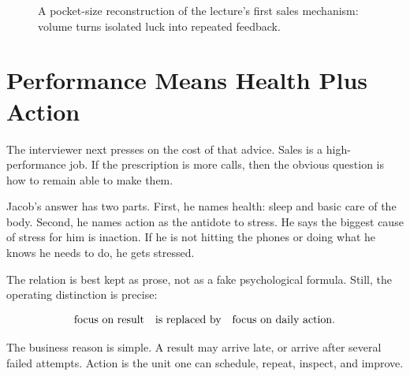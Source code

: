 \begin{figure}
\centering
{}
\caption{A pocket-size reconstruction of the lecture's first sales mechanism: volume turns isolated luck into repeated feedback.}
\end{figure}

\section{Performance Means Health Plus Action}

The interviewer next presses on the cost of that advice. Sales is a high-performance job. If the prescription is more calls, then the obvious question is how to remain able to make them.

Jacob's answer has two parts. First, he names health: sleep and basic care of the body. Second, he names action as the antidote to stress. He says the biggest cause of stress for him is inaction. If he is not hitting the phones or doing what he knows he needs to do, he gets stressed.

The relation is best kept as prose, not as a fake psychological formula. Still, the operating distinction is precise:

\begin{equation}
\hbox{focus on result} \quad \hbox{is replaced by} \quad \hbox{focus on daily action}.
\end{equation}

The business reason is simple. A result may arrive late, or arrive after several failed attempts. Action is the unit one can schedule, repeat, inspect, and improve.

